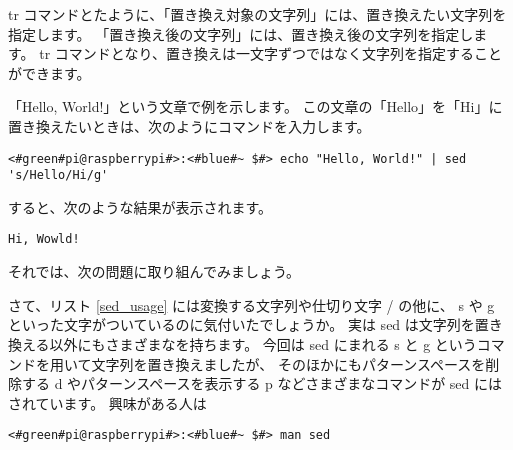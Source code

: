 tr コマンドとたように、「置き換え対象の文字列」には、置き換えたい文字列を指定します。
「置き換え後の文字列」には、置き換え後の文字列を指定します。
tr コマンドとなり、置き換えは一文字ずつではなく文字列を指定することができます。

「Hello, World!」という文章で例を示します。
この文章の「Hello」を「Hi」に置き換えたいときは、次のようにコマンドを入力します。

\begin{lstlisting}[caption=sed コマンドを使った例, label=sed_app]
<#green#pi@raspberrypi#>:<#blue#~ $#> echo "Hello, World!" | sed 's/Hello/Hi/g'
\end{lstlisting}

すると、次のような結果が表示されます。

\begin{lstlisting}[caption=sed コマンドで変換した結果, label=sed_result]
Hi, Wowld!
\end{lstlisting}

それでは、次の問題に取り組んでみましょう。

\begin{tcolorbox}[title=\useOmetoi]
\begin{enumerate}
\end{enumerate}
\end{tcolorbox}

さて、リスト \ref{sed_usage} には変換する文字列や仕切り文字 / の他に、
s や g といった文字がついているのに気付いたでしょうか。
実は sed は文字列を置き換える以外にもさまざまなを持ちます。
今回は sed にまれる s と g というコマンドを用いて文字列を置き換えましたが、
そのほかにもパターンスペースを削除する d やパターンスペースを表示する p などさまざまなコマンドが sed にはされています。
興味がある人は

\begin{lstlisting}
<#green#pi@raspberrypi#>:<#blue#~ $#> man sed
\end{lstlisting}

